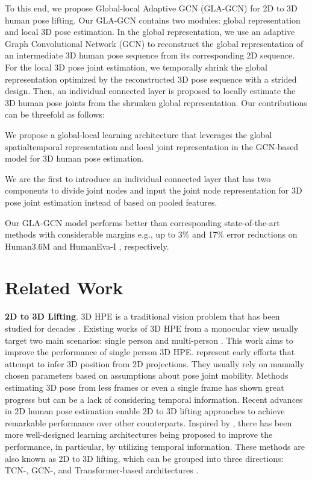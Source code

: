 \documentclass[10pt,twocolumn,letterpaper]{article}
\begin{document}
To this end, we propose Global-local Adaptive GCN (GLA-GCN) for 2D to 3D human pose lifting. Our GLA-GCN contains two modules: global representation and local 3D pose estimation. 
In the global representation, we use an adaptive Graph Convolutional Network (GCN) to reconstruct the global representation of an intermediate 3D human pose sequence from its corresponding 2D sequence. For the local 3D pose joint estimation, we temporally shrink the global representation optimized by the reconstructed 3D pose sequence with a strided design. Then, an individual connected layer is proposed to locally estimate the 3D human pose joints from the shrunken global representation. 
Our contributions can be threefold as follows:

 We propose a global-local learning architecture that leverages the global spatialtemporal representation and local joint representation in the GCN-based model for 3D human pose estimation.

 We are the first to introduce an individual connected layer that has two components to divide joint nodes and input the joint node representation for 3D pose joint estimation instead of based on pooled features.

 Our GLA-GCN model performs better than corresponding state-of-the-art methods \cite{li2022exploiting,zhang2022mixste} with considerable margins e.g., up to 3\% and 17\% error reductions on Human3.6M \cite{RN025} and HumanEva-I \cite{RN033}, respectively.

\section{Related Work}
\noindent \textbf{2D to 3D Lifting}.
3D HPE is a traditional vision problem that has been studied for decades \cite{dang2019deep,zeng2021learning,cai2019exploiting,wang2019generalizing,gartner2022trajectory,kundu2022uncertainty,wang2022distribution,wei2022capturing,wang2022ocr,liu2021multi}. Existing works of 3D HPE from a monocular view usually target two main scenarios: single person and multi-person \cite{RN007}. This work aims to improve the performance of single person 3D HPE. \cite{RN022,RN023,RN024} represent early efforts that attempt to infer 3D position from 2D projections. They usually rely on manually chosen parameters based on assumptions about pose joint mobility. Methods \cite{gong2021poseaug,zhan2022ray3d} estimating 3D pose from less frames or even a single frame has shown great progress but can be a lack of considering temporal information. Recent advances in 2D human pose estimation \cite{RN003,RN004,RN005} enable 2D to 3D lifting approaches to achieve remarkable performance over other counterparts.
Inspired by \cite{RN011}, there has been more well-designed learning architectures being proposed to improve the performance, in particular, by utilizing temporal information. These methods are also known as 2D to 3D lifting, which can be grouped into three directions: TCN-, GCN-, and Transformer-based architectures \cite{RN012,RN013,RN018,RN014, hu2021conditional,li2022exploiting, zhang2022mixste}.
\end{document}

